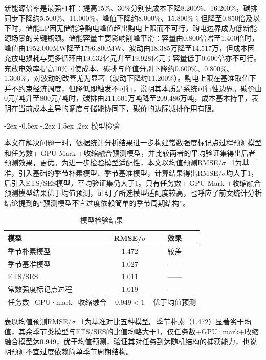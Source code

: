 \documentclass{article}
\makeatletter
\renewcommand\section{\@startsection{section}{1}{\z@}%
 {-2ex \@plus -0.5ex \@minus -.2ex}
 {1.5ex \@plus.2ex}
 {\centering\heiti\zihao{4}}}
\makeatother
\begin{document}
新能源倍率是最强杠杆：提高15\%、30\%分别使成本下降8.200\%、16.200\%，碳排同步下降约5.500\%、11.000\%，峰值下降约8.000\%、15.800\%；但降至0.850倍及以下时，储能LP因无储能净购电峰值超出购电上限而不可行，购电边界成为低新能源场景的关键瓶颈。储能容量主要影响削峰平滑：容量由0.800倍增至1.400倍时，峰值由1952.000MW降至1796.800MW、波动由18.385万降至14.517万，但成本因充放电损耗与更多循环由19.632亿元升至19.928亿元；容量低于0.600倍亦不可行。充放电效率提高10\%可使成本、碳排与峰值分别下降约0.600\%、0.800\%、1.300\%，对波动的改善尤为显著（波动下降约11.200\%）。购电上限在基准取值下并不约束经济调度，但降低即触发不可行，说明其本质是系统可行性边界。碳价由0元/吨升至800元/吨时，碳排由211.601万吨降至209.486万吨，成本基本持平，表明在当前成本主导的调度与储能协同下，碳价的边际减排作用有限。

\section{模型检验}

本文在解决问题一时，依据统计分析结果进一步构建常数强度标记点过程预测模型和任务数+ GPU Mark +收缩融合预测模型，并比较两者的平均验证集得出后者预测效果，更优。为进一步检验模型适配性，本文以均值预测RMSE/$\sigma$=1为基准，引入基础的季节朴素模型、季节基准模型，计算结果得出RMSE/$\sigma$均大于1，后引入ETS/SES模型，平均验证集仍大于1。只有任务数+ GPU Mark +收缩融合预测模型结果优于均值预测，证明了所选模型适配度较高，也呼应了前文统计分析结论提到的“预测模型不宜过度依赖简单的季节周期结构”。

\begin{table}[H]
\centering
\caption{模型检验结果}
\begin{tabularx}{\textwidth}{>{\centering\arraybackslash}Xcc}
\toprule
模型& RMSE/$\sigma$ & 效果\\
\midrule
季节朴素模型 & 1.472 & 较差\\
季节基准模型 & 1.027 & ——\\
ETS/SES & 1.011 & ——\\
常数强度标记点过程 & 1.019 & ——\\
任务数+GPU·mark+收缩融合 & $0.949<1$ & 优于均值预测\\
\bottomrule
\end{tabularx}
\end{table}

表以均值预测RMSE/$\sigma$=1为基准对比五种模型。季节朴素（1.472）显著劣于均值，其余季节类模型与ETS/SES的比值均略大于1，仅任务数+GPU·mark+收缩融合模型达0.949，优于均值预测，验证其对任务到达随机结构的捕获能力，也说明预测不宜过度依赖简单季节周期结构。
\end{document}
